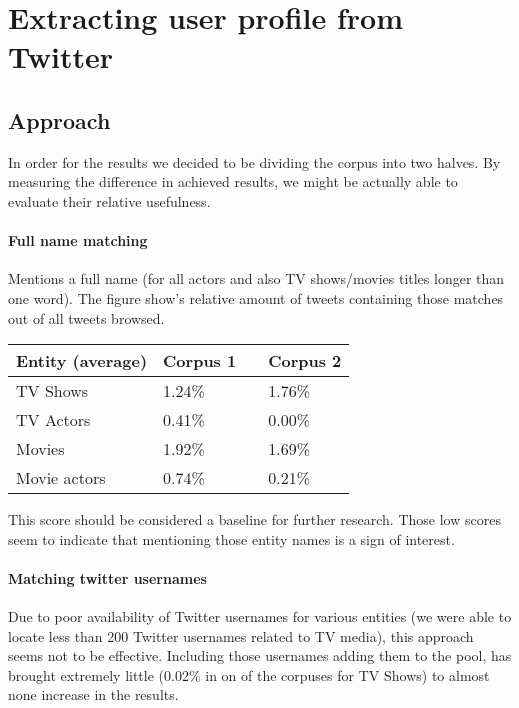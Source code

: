 \section{Extracting user profile from Twitter}

\subsection{Approach}
In order for the results we decided to be dividing the corpus into two halves.
By measuring the difference in achieved results, we might be actually able to
evaluate their relative usefulness.

\paragraph{Full name matching}
Mentions a full name (for all actors and also TV shows/movies titles longer
than one word). The figure show's relative amount of tweets containing those
matches out of all tweets browsed.

\begin{center}
  \begin{tabular}{ | p{4cm} | p{2cm} | p{1cm}| p{2cm} | } \hline
    Entity (average) & Corpus 1 & & Corpus 2 \\ \hline
    TV Shows & 1.24\% & & 1.76\% \\ \hline
    TV Actors & 0.41\% & & 0.00\% \\ \hline
    Movies & 1.92\% & & 1.69\% \\ \hline
    Movie actors & 0.74\% & & 0.21\% \\ \hline
  \end{tabular}
\end{center}

This score should be considered a baseline for further research. Those low scores seem to indicate
that mentioning those entity names is a sign of interest.

\paragraph{Matching twitter usernames}
Due to poor availability of Twitter usernames for various entities (we were able to locate less than 200 Twitter
usernames related to TV media), this approach seems not to be effective. Including those usernames adding them to the pool,
has brought extremely little (0.02\% in on of the corpuses for TV Shows) to almost none increase in the results.

